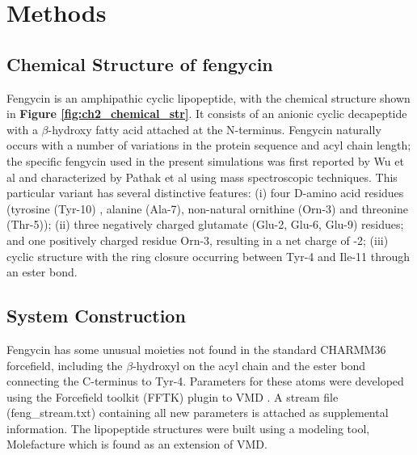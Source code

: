 \section{Methods}
\label{s:ch2_methods}

\subsection{Chemical Structure of fengycin} 
\label{ss:ch2_chem_str} 


Fengycin is an
amphipathic cyclic lipopeptide, with the chemical structure shown in \textbf{Figure
\ref{fig:ch2_chemical_str}}. It consists of an anionic cyclic decapeptide with a
$\beta \mbox{-}$hydroxy fatty acid attached at the N-terminus.
\cite{HornGrossfield2013} Fengycin naturally occurs with a number of variations in the protein sequence and acyl
chain length; the specific fengycin used in the present simulations was first
reported by Wu et al and characterized by Pathak et al using mass spectroscopic
techniques.\cite{Liu2007,Balaram2012} This particular variant has several
distinctive features: (i) four D-amino acid residues
(tyrosine (Tyr-10) , alanine (Ala-7), non-natural ornithine (Orn-3) and threonine (Thr-5));
(ii) three negatively charged glutamate (Glu-2, Glu-6, Glu-9) residues; and one positively charged
residue Orn-3, resulting in a net charge of -2; (iii) cyclic structure with the
ring closure occurring between Tyr-4 and Ile-11 through an ester bond.



\subsection{System Construction} 
\label{ss:ch2_sys_constr} 
Fengycin has some unusual
moieties not found in the standard CHARMM36 forcefield, including the $\beta \mbox{-}$hydroxyl
on the acyl chain and the ester bond connecting the C-terminus to
Tyr-4. Parameters for these atoms were developed using the Forcefield
toolkit (FFTK) plugin to VMD \cite{Gumbart2013,Schulten1996}. A stream file (feng\_stream.txt)
containing all new parameters is attached as supplemental information.
The lipopeptide structures were built using a modeling tool, Molefacture
 which is found as an extension of VMD.\cite{Schulten1996}

